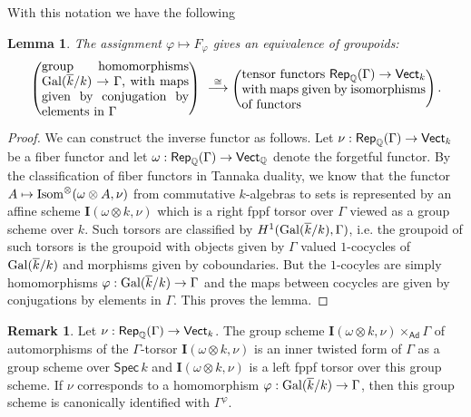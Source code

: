 \documentclass[twoside,leqno]{article}
\numberwithin{equation}{section}
\theoremstyle{plain}
\newtheorem{lemma}[equation]{Lemma}
\theoremstyle{definition}
\newtheorem{remark}[equation]{Remark}
\begin{document}
\medskip
With this notation we have the following

\begin{lemma} \label{lem:nuVect}
The assignment $\varphi \mapsto
F_{\varphi}$ gives an equivalence of groupoids:
\[
\left(\text{\begin{minipage}[c]{1.6in}
group homomorphisms $\Gal(\kbar/k) \to \Gamma$, with maps given 
by conjugation by elements in $\Gamma$
\end{minipage}}\right)
\
\stackrel{\cong}{\longrightarrow}
\left(\text{\begin{minipage}[c]{2in}tensor
  functors $\mathsf{Rep}_{\bbQ}(\Gamma) \to \mathsf{Vect}_{k}$
  with maps given by isomorphisms of functors\end{minipage}}\right).
\]
\end{lemma}
\begin{proof} We can construct the inverse functor as follows.
 Let $\nu : \mathsf{Rep}_{\mathbb Q}(\Gamma) \to
\mathsf{Vect}_{k}$ be a fiber functor and let $\omega :
\mathsf{Rep}_{\mathbb Q}(\Gamma) \to \mathsf{Vect}_{\mathbb Q}$ denote the
forgetful functor.  By the classification
\cite[Theorem~II.8.1]{milne-tannakian} of fiber functors in Tannaka
duality, we know that the functor $A \mapsto
\operatorname{Isom}^{\otimes}(\omega\otimes A,\nu)$ from commutative
$k$-algebras to sets is represented by an affine scheme
$\mathbf{I}(\omega\otimes k,\nu)$ which is a right fppf torsor over
$\Gamma$ viewed as a group scheme over $k$. Such torsors are
classified by $H^{1}(\operatorname{Gal}(\overline{k}/k),\Gamma)$, i.e. the groupoid of such
torsors is the groupoid with objects given by $\Gamma$ valued
$1$-cocycles of $\operatorname{Gal}(\overline{k}/k)$ and morphisms given by
coboundaries. But the $1$-cocyles are simply homomorphisms $\varphi :
\operatorname{Gal}(\overline{k}/k) \to \Gamma$ and the maps between cocycles are given by
conjugations by elements in $\Gamma$. This proves the lemma.  
\end{proof}

\begin{remark} \label{rem:leftact} 
Let $\nu :
\mathsf{Rep}_{\mathbb Q}(\Gamma) \to \mathsf{Vect}_{k}$. The group scheme
$\mathbf{I}(\omega\otimes k,\nu)\times_{\mathsf{Ad}} \Gamma$ of
automorphisms of the $\Gamma$-torsor $\mathbf{I}(\omega\otimes k,\nu)$
is an inner twisted form of $\Gamma$ as a group scheme over
$\mathsf{Spec}\, k$ and $\mathbf{I}(\omega\otimes k,\nu)$ is a left
fppf torsor over this group scheme. If $\nu$ corresponds to a
homomorphism $\varphi : \operatorname{Gal}(\overline{k}/k) \to \Gamma$, then this group
scheme is canonically identified with $\Gamma^{\varphi}$.
\end{remark}
\end{document}
